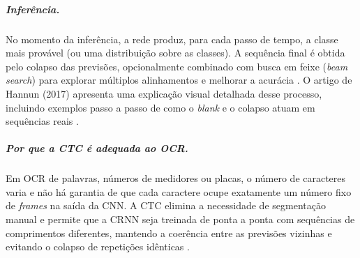 \subparagraph{Inferência.}
No momento da inferência, a rede produz, para cada passo de tempo, 
a classe mais provável (ou uma distribuição sobre as classes). 
A sequência final é obtida pelo colapso das previsões, 
opcionalmente combinado com busca em feixe (\textit{beam search}) 
para explorar múltiplos alinhamentos e melhorar a acurácia \cite{hannun2017ctc}. 
O artigo de Hannun (2017) apresenta uma explicação visual detalhada desse processo, 
incluindo exemplos passo a passo de como o \textit{blank} e o 
colapso atuam em sequências reais \cite{hannun2017ctc}.

\subparagraph{Por que a CTC é adequada ao OCR.}
Em OCR de palavras, números de medidores ou placas, 
o número de caracteres varia e não há garantia de que 
cada caractere ocupe exatamente um número fixo de \textit{frames} 
na saída da CNN. 
A CTC elimina a necessidade de segmentação manual e permite que a 
CRNN seja treinada de ponta a ponta com sequências de comprimentos diferentes, 
mantendo a coerência entre as previsões vizinhas e evitando 
o colapso de repetições idênticas \cite{shi2017crnn, graves2006ctc}.